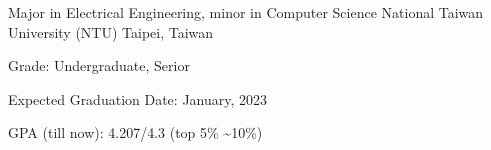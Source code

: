 

\begin{cventries}

  \cventry
    {Major in Electrical Engineering, minor in Computer Science} %
    {National Taiwan University (NTU)} %
    {Taipei, Taiwan} %
    {} %
    {
      \begin{cvitems} %
        \item {Grade: Undergraduate, Serior}
        \item {Expected Graduation Date: January, 2023}
        \item {GPA (till now): 4.207/4.3 (top 5\% \textasciitilde 10\%)}
      \end{cvitems}
    }

\end{cventries}
